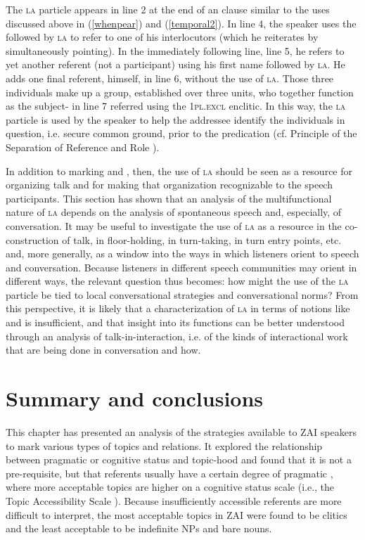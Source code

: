 The \textsc{la} particle appears in line 2 at the end of an  clause similar to the uses discussed above in (\ref{whenpear}) and (\ref{temporal2}). In line 4, the speaker uses the   followed by \textsc{la} to refer to one of his interlocutors (which he reiterates by simultaneously pointing). In the immediately following line, line 5, he refers to yet another  referent (not a participant) using his first name followed by \textsc{la}. He adds one final referent, himself, in line 6, without the use of \textsc{la}. Those three individuals make up a group, established over three  units, who together function as the subject- in line 7 referred using the 1\textsc{pl.excl} enclitic. In this way, the \textsc{la} particle is used by the speaker to help the addressee identify the individuals in question, i.e. secure common ground, prior to the predication (cf. Principle of the Separation of Reference and Role \citep{lambrecht1994}).

In addition to  marking and , then, the use of \textsc{la} should be seen as a resource for organizing talk and for making that organization recognizable to the speech participants. This section has shown that an analysis of the multifunctional nature of \textsc{la} depends on the analysis of spontaneous speech and, especially, of conversation. It may be useful to investigate the use of \textsc{la} as a resource in the co-construction of talk, in floor-holding, in turn-taking, in turn entry points, etc. and, more generally, as a window into the ways in which listeners orient to speech and conversation. Because listeners in different speech communities may orient in different ways, the relevant question thus becomes: how might the use of the \textsc{la} particle be tied to local conversational strategies and conversational norms? From this perspective, it is likely that a characterization of \textsc{la} in terms of notions like  and  is insufficient, and that insight into its functions can be better understood through an analysis of talk-in-interaction, i.e. of the kinds of interactional work that are being done in conversation and how.


\section{Summary and conclusions}

This chapter has presented an analysis of the strategies available to ZAI speakers to mark various types of topics and  relations. It explored the relationship between pragmatic or cognitive status and topic-hood and found that it is not a pre-requisite, but that  referents usually have a certain degree of pragmatic , where more acceptable topics are higher on a cognitive status scale (i.e., the Topic Accessibility Scale \citep{lambrecht1994}). Because insufficiently accessible  referents are more difficult to interpret, the most acceptable topics in ZAI were found to be clitics and the least acceptable to be indefinite NPs and bare nouns.


